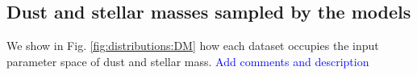 \documentclass[onecolumn]{aa}
\begin{document}

\subsection{Dust and stellar masses sampled by the models}
\label{subsec:res:dust:mass}
We show in Fig. \ref{fig:distributions:DM} how each dataset occupies the input parameter space of dust and stellar mass. 
\textcolor{blue}{Add comments and description}
\end{document}
